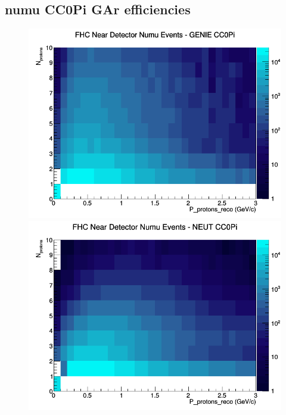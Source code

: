 \subsection{numu CC0Pi GAr efficiencies}
\begin{figure}[h]
\includegraphics[width=\linewidth]{eff_N_P/GAr/protons/CC0Pi_FHC_ND_numu_N_P_GENIE.png}
\endminipage
{}
\includegraphics[width=\linewidth]{eff_N_P/GAr/protons/CC0Pi_FHC_ND_numu_N_P_NEUT.png}
\endminipage
{}

\end{figure}
